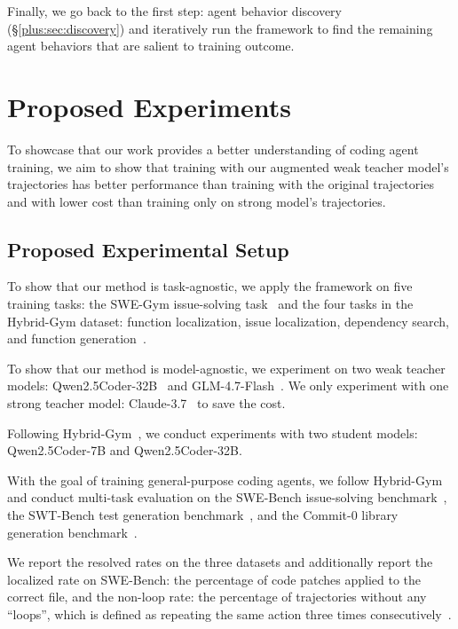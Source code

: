 Finally, we go back to the first step: agent behavior discovery (\S\ref{plus:sec:discovery}) and iteratively run the framework to find the remaining agent behaviors that are salient to training outcome.






\section{Proposed Experiments}
To showcase that our work provides a better understanding of coding agent training, we aim to show that training with our augmented weak teacher model's trajectories has better performance than training with the original trajectories and with lower cost than training only on strong model's trajectories.


\subsection{Proposed Experimental Setup}
To show that our method is task-agnostic, we apply the \plusname framework on five training tasks: the SWE-Gym issue-solving task~\cite{swegym} and the four tasks in the Hybrid-Gym dataset: function localization, issue localization, dependency search, and function generation~\cite{hybrid-gym}.

To show that our method is model-agnostic, we experiment on two weak teacher models: Qwen2.5Coder-32B~\cite{qwen25coder} and GLM-4.7-Flash~\cite{GLM-4.7}. We only experiment with one strong teacher model: Claude-3.7~\cite{claude37} to save the cost.

Following Hybrid-Gym~\cite{hybrid-gym}, we conduct experiments with two student models: Qwen2.5Coder-7B and Qwen2.5Coder-32B.

With the goal of training general-purpose coding agents, we follow Hybrid-Gym~\cite{hybrid-gym} and conduct multi-task evaluation on the SWE-Bench issue-solving benchmark~\cite{swebench}, the SWT-Bench test generation benchmark~\cite{swt-bench}, and the Commit-0 library generation benchmark~\cite{commit0}.

We report the resolved rates on the three datasets and additionally report the localized rate on SWE-Bench: the percentage of code patches applied to the correct file, and the non-loop rate: the percentage of trajectories without any ``loops'', which is defined as repeating the same action three times consecutively~\cite{swegym}.

